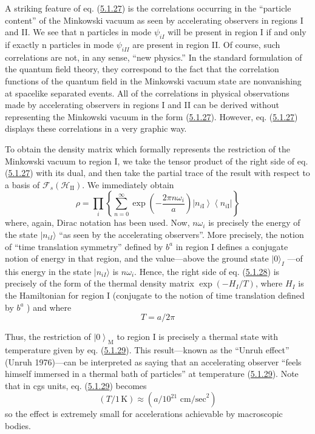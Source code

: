 \documentclass[11pt,a4paper]{article}
\providecommand{\ket}[1]{\left\lvert#1\right\rangle}
\providecommand{\bra}[1]{\left\langle#1\right\rvert}
\begin{document}
A striking feature of eq. (\hyperref[eq:5.1.27]{5.1.27}) is the correlations occurring in the ``particle content'' of the Minkowski vacuum as seen by accelerating observers in regions I and II. We see that n particles in mode \hypertarget{source-128}{} \(\psi_{iI}\) will be present in region I if and only if exactly n particles in mode \(\psi_{iII}\) are present in region II. Of course, such correlations are not, in any sense, ``new physics.'' In the standard formulation of the quantum field theory, they correspond to the fact that the correlation functions of the quantum field in the Minkowski vacuum state are nonvanishing at spacelike separated events. All of the correlations in physical observations made by accelerating observers in regions I and II can be derived without representing the Minkowski vacuum in the form (\hyperref[eq:5.1.27]{5.1.27}). However, eq. (\hyperref[eq:5.1.27]{5.1.27}) displays these correlations in a very graphic way.

To obtain the density matrix which formally represents the restriction of the Minkowski vacuum to region I, we take the tensor product of the right side of eq. (\hyperref[eq:5.1.27]{5.1.27}) with its dual, and then take the partial trace of the result with respect to a basis of \(\mathcal{F}_s(\mathcal{H}_{\mathrm{II}})\). We immediately obtain
\begin{equation*}
\rho=\prod_i\left\{\sum_{n=0}^{\infty}
\exp\left(-\frac{2\pi n\omega_i}{a}\right)
\ket{n_{i\mathrm{I}}}\bra{n_{i\mathrm{I}}}\right\} \tag{5.1.28}\label{eq:5.1.28}
\end{equation*}
where, again, Dirac notation has been used. Now, \(n\omega_i\) is precisely the energy of the state \(\lvert n_{iI}\rangle\) ``as seen by the accelerating observers''. More precisely, the notion of ``time translation symmetry'' defined by \(b^a\) in region I defines a conjugate notion of energy in that region, and the value---above the ground state \(\lvert 0\rangle_I\) ---of this energy in the state \(\lvert n_{iI}\rangle\) is \(n\omega_i\). Hence, the right side of eq. (\hyperref[eq:5.1.28]{5.1.28}) is precisely of the form of the thermal density matrix \(\exp(-H_I/T)\), where \(H_I\) is the Hamiltonian for region I (conjugate to the notion of time translation defined by \(b^a\) ) and where
\begin{equation*}
T = a/2\pi \tag{5.1.29}\label{eq:5.1.29}
\end{equation*}

Thus, the restriction of \(\ket{0}_{\mathrm M}\) to region I is precisely a thermal state with temperature given by eq. (\hyperref[eq:5.1.29]{5.1.29}). This result---known as the ``Unruh effect'' (Unruh 1976)---can be interpreted as saying that an accelerating observer ``feels himself immersed in a thermal bath of particles'' at temperature (\hyperref[eq:5.1.29]{5.1.29}). Note that in cgs units, eq. (\hyperref[eq:5.1.29]{5.1.29}) becomes
\begin{equation*}
(T/1\,\mathrm K) \approx (a/10^{21} \text{ cm/sec}^2) \tag{5.1.30}\label{eq:5.1.30}
\end{equation*} \hypertarget{source-129}{} so the effect is extremely small for accelerations achievable by macroscopic bodies.
\end{document}
